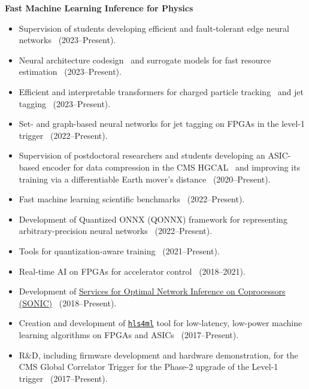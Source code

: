 \documentclass[11pt]{res}
\begin{document}
\begin{resume}
  \textbf{Fast Machine Learning Inference for Physics}
  \begin{itemize}
    \itemsep-0.3em
    \item Supervision of students developing efficient and fault-tolerant edge neural networks~\cite{Weng:2025amigolut,Baldi:2024reliable,Weng:2024fkeras,Weng:2023tailor} (2023--Present).
    \item Neural architecture codesign~\cite{Weitz:2026xsv,Weitz:2025dia,Weitz:2025tcj,McDermott:2023neural} and surrogate models for fast resource estimation~\cite{Hawks:2025hew} (2023--Present).
    \item Efficient and interpretable transformers for charged particle tracking~\cite{Miao:2026yvl,Govil:2025nvy,Miao:2024oqy} and jet tagging~\cite{Wang:2026lqb,Legge:2025cnm,Wang:2025dky,Bhatnagar:2024fkx} (2023--Present).
    \item Set- and graph-based neural networks for jet tagging on FPGAs in the level-1 trigger~\cite{Odagiu:2024bkp} (2022--Present).
    \item Supervision of postdoctoral researchers and students developing an ASIC-based encoder for data compression in the CMS HGCAL~\cite{DiGuglielmo:2021ide} and improving its training via a differentiable Earth mover's distance~\cite{Shenoy:2023ros} ({2020--Present}).
    \item Fast machine learning scientific benchmarks~\cite{Duarte:2022hdp} (2022--Present).
    \item Development of Quantized ONNX (QONNX) framework for representing arbitrary-precision neural networks~\cite{Pappalardo:2022nxk} (2022--Present).
    \item Tools for quantization-aware training~\cite{Campos:2023pkp,Hawks:2021ruw} (2021--Present).
    \item Real-time AI on FPGAs for accelerator control~\cite{John:2020sak} ({2018--2021}).
    \item Development of \href{https://fastmachinelearning.org/SuperSONIC/}{Services for Optimal Network Inference on Coprocessors (SONIC)}~\cite{Kondratyev:2025jfj,Zhao:2025daw,CMS:2024twn,CMS-DP-2023-037,Krupa:2020bwg,Rankin:2020usv,neurips2019_sonic,Duarte:2019fta} ({2018--Present}).
    \item Creation and development of \href{https://fastmachinelearning.org/hls4ml/}{\texttt{hls4ml}} tool for low-latency, low-power machine learning algorithms on FPGAs and ASICs~\cite{Gonski:2026jgu,Schulte:2025mai,Hussain:2022faststamp,Borras:2022opensource,Banbury:2021mlperf,DiGuglielmo:2021ide,Fahim:2021cic,Deiana:2021niw,Elabd:2021lgo,Govorkova:2021utb,Iiyama:2020wap,Heintz:2020soy,DiGuglielmo:2020eqx,Summers:2020xiy,neurips2019_hls4ml,Duarte:2018ite} ({2017--Present}).
    \item R\&D, including firmware development and hardware demonstration, for the CMS Global Correlator Trigger for the Phase-2 upgrade of the Level-1 trigger~\cite{CERN-LHCC-2020-004} (2017--Present).
  \end{itemize}


\end{resume}
\end{document}
